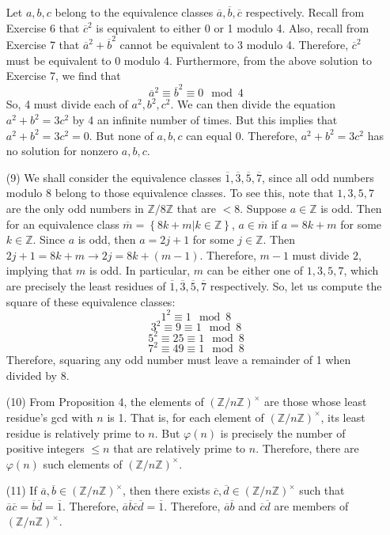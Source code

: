 \documentclass[12pt]{article}
\begin{document}
\begin{itemize}
Let $a, b, c$ belong to the equivalence classes $\overline{a}, \overline{b}, \overline{c}$ respectively. Recall from Exercise 6 that $\overline{c}^2$ is equivalent to either 0 or 1 modulo 4. Also, recall from Exercise 7 that $\overline{a}^2 + \overline{b}^2$ cannot be equivalent to 3 modulo 4. Therefore, $\overline{c}^2$ must be equivalent to 0 modulo 4. Furthermore, from the above solution to Exercise 7, we find that
$$\overline{a}^2 \equiv \overline{b}^2 \equiv 0 \mod 4$$
So, 4 must divide each of $a^2, b^2, c^2$. We can then divide the equation $a^2 + b^2 = 3c^2$ by 4 an infinite number of times. But this implies that $a^2 + b^2 = 3c^2 = 0$. But none of $a, b, c$ can equal 0. Therefore, $a^2 + b^2 = 3c^2$ has no solution for nonzero $a, b, c$.
\item[(9)] We shall consider the equivalence classes $\overline{1}, \overline{3}, \overline{5}, \overline{7}$, since all odd numbers modulo 8 belong to those equivalence classes. To see this, note that $1, 3, 5, 7$ are the only odd numbers in $\mathbb{Z}/8\mathbb{Z}$ that are $< 8$. Suppose $a \in \mathbb{Z}$ is odd. Then for an equivalence class $\overline{m} = \left\lbrace 8k + m | k \in \mathbb{Z}\right\rbrace$, $a \in \overline{m}$ if $a = 8k + m$ for some $k \in \mathbb{Z}$. Since $a$ is odd, then $a = 2j + 1$ for some $j \in \mathbb{Z}$. Then $2j + 1 = 8k + m \rightarrow 2j = 8k + (m - 1)$. Therefore, $m - 1$ must divide $2$, implying that $m$ is odd. In particular, $m$ can be either one of $1, 3, 5, 7$, which are precisely the least residues of  $\overline{1}, \overline{3}, \overline{5}, \overline{7}$ respectively. So, let us compute the square of these equivalence classes:
$$1^2 \equiv 1 \mod 8$$
$$3^2 \equiv 9 \equiv 1 \mod 8$$
$$5^2 \equiv 25 \equiv 1 \mod 8$$
$$7^2 \equiv 49 \equiv 1 \mod 8$$
Therefore, squaring any odd number must leave a remainder of 1 when divided by 8.
\item[(10)] From Proposition 4, the elements of $(\mathbb{Z}/n\mathbb{Z})^\times$ are those whose least residue's gcd with $n$ is 1. That is, for each element of $(\mathbb{Z}/n\mathbb{Z})^\times$, its least residue is relatively prime to $n$. But $\varphi(n)$ is precisely the number of positive integers $\leq n$ that are relatively prime to $n$. Therefore, there are $\varphi(n)$ such elements of $(\mathbb{Z}/n\mathbb{Z})^\times$.
\item[(11)] If $\overline{a}, \overline{b} \in (\mathbb{Z}/n\mathbb{Z})^\times$, then there exists $\overline{c}, \overline{d} \in (\mathbb{Z}/n\mathbb{Z})^\times$ such that $\overline{a}\overline{c} = \overline{b}\overline{d} = \overline{1}$. Therefore, $\overline{a}\overline{b}\overline{c}\overline{d} = \overline{1}$. Therefore, $\overline{a}\overline{b}$ and $\overline{c}\overline{d}$ are members of $(\mathbb{Z}/n\mathbb{Z})^\times$.

\end{itemize}
\end{document}
